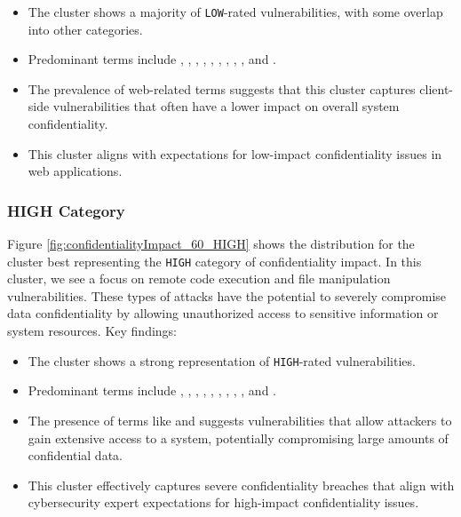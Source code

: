 \documentclass[12pt]{article}
\begin{document}
\begin{itemize}

	\item The cluster shows a majority of \texttt{LOW}-rated vulnerabilities, with some overlap into
	      other categories.

	\item Predominant terms include , , , , , ,
	      , , , and .

	\item The prevalence of web-related terms suggests that this cluster captures client-side
	      vulnerabilities that often have a lower impact on overall system confidentiality.

	\item This cluster aligns with expectations for low-impact confidentiality issues in web
	      applications.

\end{itemize}

\subsubsection*{HIGH Category}

Figure \ref{fig:confidentialityImpact_60_HIGH} shows the distribution for the cluster best
representing the \texttt{HIGH} category of confidentiality impact. In this cluster, we see a focus
on remote code execution and file manipulation vulnerabilities. These types of attacks have the
potential to severely compromise data confidentiality by allowing unauthorized access to sensitive
information or system resources. Key findings:

\begin{itemize}

	\item The cluster shows a strong representation of \texttt{HIGH}-rated vulnerabilities.

	\item Predominant terms include , , ,
	      , , ,
	      , , , and .

	\item The presence of terms like  and  suggests vulnerabilities that allow
	      attackers to gain extensive access to a system, potentially compromising large amounts of
	      confidential data.

	\item This cluster effectively captures severe confidentiality breaches that align with
	      cybersecurity expert expectations for high-impact confidentiality issues.

\end{itemize}
\end{document}
